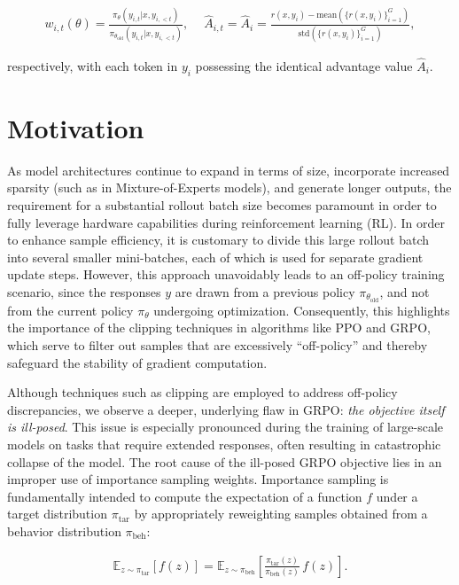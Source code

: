 \begin{align}
    w_{i,t}(\theta)=\frac{ \pi_{\theta} (y_{i,t} | x, y_{i,<t}) }{ \pi_{\theta_\text{old}} (y_{i,t} | x,y_{i,<t})},\quad\ 
    \widehat{A}_{i,t} = \widehat{A}_{i} = \frac{r(x, y_i) - \mathrm{mean} \left( \{ r(x, y_i) \}_{i=1}^G \right) }{ \mathrm{std} \left( \{ r(x, y_i) \}_{i=1}^G \right) },
\end{align}

respectively, with each token in $y_i$ possessing the identical advantage value $\widehat{A}_{i}$.

\section{Motivation}
\label{sec:motivation}

As model architectures continue to expand in terms of size, incorporate increased sparsity (such as in Mixture-of-Experts models), and generate longer outputs, the requirement for a substantial rollout batch size becomes paramount in order to fully leverage hardware capabilities during reinforcement learning (RL). In order to enhance sample efficiency, it is customary to divide this large rollout batch into several smaller mini-batches, each of which is used for separate gradient update steps. However, this approach unavoidably leads to an off-policy training scenario, since the responses $y$ are drawn from a previous policy $\pi_{\theta_\text{old}}$, and not from the current policy $\pi_\theta$ undergoing optimization. Consequently, this highlights the importance of the clipping techniques in algorithms like PPO and GRPO, which serve to filter out samples that are excessively ``off-policy'' and thereby safeguard the stability of gradient computation.

Although techniques such as clipping are employed to address off-policy discrepancies, we observe a deeper, underlying flaw in GRPO: \textit{the objective itself is ill-posed}. This issue is especially pronounced during the training of large-scale models on tasks that require extended responses, often resulting in catastrophic collapse of the model. The root cause of the ill-posed GRPO objective lies in an improper use of importance sampling weights. Importance sampling is fundamentally intended to compute the expectation of a function $f$ under a target distribution $\pi_\text{tar}$ by appropriately reweighting samples obtained from a behavior distribution $\pi_\text{beh}$:

\begin{align}
\mathbb{E}_{z \sim \pi_\text{tar}} \left[ f(z) \right] = \mathbb{E}_{z \sim \pi_\text{beh}} \left[ \frac{ \pi_\text{tar} (z) }{ \pi_\text{beh} (z)} \, f(z) \right].
\end{align}


